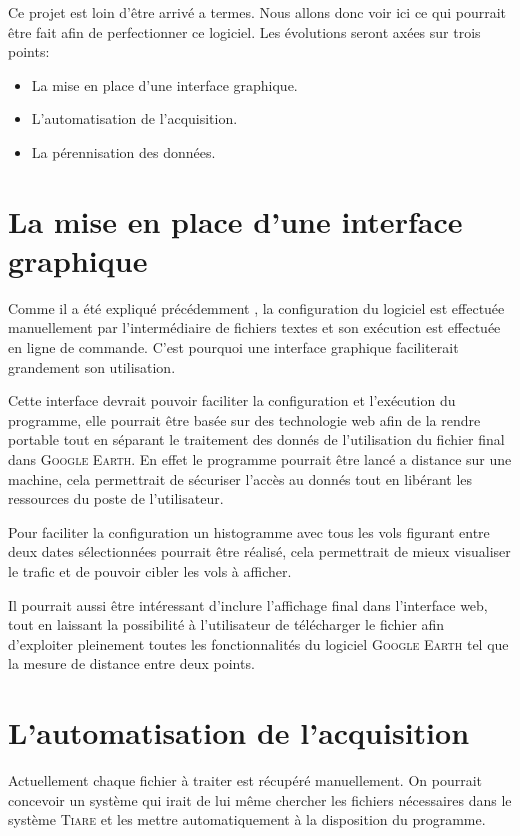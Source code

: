 \label{evolution}
Ce projet est loin d'être arrivé a termes. Nous allons donc voir ici ce qui pourrait être fait afin de perfectionner ce logiciel. Les évolutions seront axées sur trois points:
\begin{itemize}
    \item La mise en place d'une interface graphique.
    \item L'automatisation de l'acquisition.
    \item La pérennisation des données.
\end{itemize}

\section{La mise en place d'une interface graphique}
Comme il a été expliqué précédemment , la configuration du logiciel est effectuée manuellement par l'intermédiaire de fichiers textes et son exécution est effectuée en ligne de commande. C'est pourquoi une interface graphique faciliterait grandement son utilisation.

Cette interface devrait pouvoir faciliter la configuration et l'exécution du programme, elle pourrait être basée sur des technologie web afin de la rendre portable tout en séparant le traitement des donnés de l'utilisation du fichier final dans \textsc{Google Earth}. En effet le programme pourrait être lancé a distance sur une machine, cela permettrait de sécuriser l'accès au donnés tout en libérant les ressources du poste de l'utilisateur.

Pour faciliter la configuration un histogramme avec tous les vols figurant entre deux dates sélectionnées pourrait être réalisé, cela permettrait de mieux visualiser le trafic et de pouvoir cibler les vols à afficher.

Il pourrait aussi être intéressant d'inclure l'affichage final dans l'interface web, tout en laissant la possibilité à l'utilisateur de télécharger le fichier afin d'exploiter pleinement toutes les fonctionnalités du logiciel \textsc{Google Earth} tel que la mesure de distance entre deux points.

\section{L'automatisation de l'acquisition}
Actuellement chaque fichier à traiter est récupéré manuellement. On pourrait concevoir un système qui irait de lui même chercher les fichiers nécessaires dans le système \textsc{Tiare} et les mettre automatiquement à la disposition du programme.

